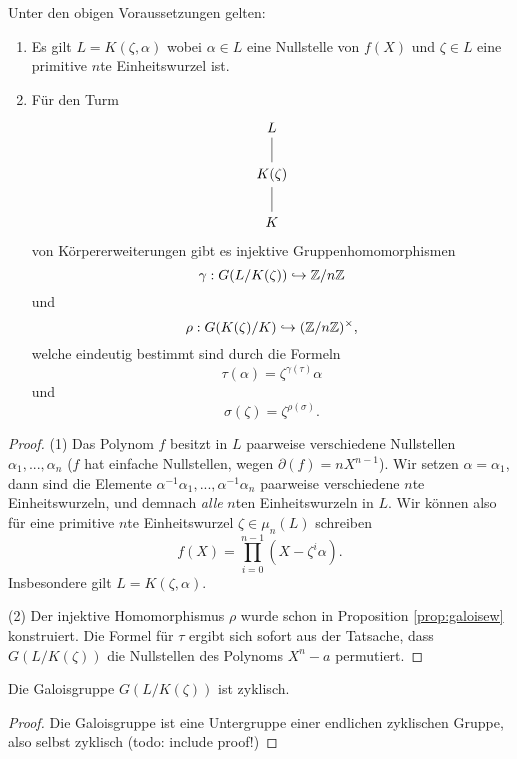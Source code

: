 \documentclass{book}
\begin{document}
\begin{prop}
    \label{prop:radgalois} Unter den obigen Voraussetzungen gelten:
    \begin{enumerate}
        \item Es gilt $L = K(\zeta, \alpha)$ wobei $\alpha \in L$ eine
            Nullstelle von $f(X)$ und $\zeta \in L$ eine primitive $n$te
            Einheitswurzel ist. 
        \item Für den Turm
            \[
            \begin{tikzcd}
                L \ar[dash]{d} \\
                K(\zeta)\ar[dash]{d}\\
                K
            \end{tikzcd}
            \]
            von Körpererweiterungen gibt es injektive Gruppenhomomorphismen
            \[
                \gamma: G(L/K(\zeta)) \hookrightarrow \mathbb{Z}/n\mathbb{Z}
            \]
            und
            \[
                \rho: G(K(\zeta)/K) \hookrightarrow (\mathbb{Z}/n\mathbb{Z})^{\times},
            \]
            welche eindeutig bestimmt sind durch die Formeln
            \[
                \tau(\alpha) = \zeta^{\gamma(\tau)} \alpha
            \]
            und
            \[
                \sigma(\zeta) = \zeta^{\rho(\sigma)}.
            \]
    \end{enumerate}
\end{prop}
\begin{proof}
    (1) Das Polynom $f$ besitzt in $L$ paarweise verschiedene Nullstellen
    $\alpha_1, ..., \alpha_n$ ($f$ hat einfache Nullstellen, wegen $\partial(f)
    = n X^{n-1}$). Wir setzen $\alpha = \alpha_1$, dann sind die Elemente
    $\alpha^{-1} \alpha_1, ..., \alpha^{-1} \alpha_n$ paarweise verschiedene
    $n$te Einheitswurzeln, und demnach {\em alle} $n$ten Einheitswurzeln in
    $L$. Wir können also für eine primitive $n$te Einheitswurzel $\zeta \in
    \mu_n(L)$ schreiben
    \[
        f(X) = \prod_{i = 0}^{n-1} (X - \zeta^i \alpha).
    \]
    Insbesondere gilt $L = K(\zeta,\alpha)$. 

    (2) Der injektive Homomorphismus $\rho$ wurde schon in Proposition
    \ref{prop:galoisew} konstruiert. Die Formel für $\tau$ ergibt sich sofort
    aus der Tatsache, dass $G(L/K(\zeta))$ die Nullstellen des Polynoms $X^n -
    a$ permutiert. 
\end{proof}

\begin{cor}
    \label{cor:galzyklisch}
    Die Galoisgruppe $G(L/K(\zeta))$ ist zyklisch.  
\end{cor}
\begin{proof}
    Die Galoisgruppe ist eine Untergruppe einer endlichen zyklischen Gruppe, also selbst
    zyklisch (todo: include proof!)
\end{proof}
\end{document}
